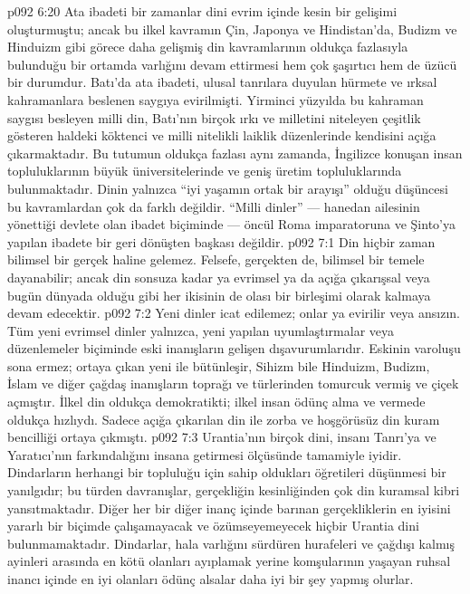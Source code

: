 \vs p092 6:20 Ata ibadeti bir zamanlar dini evrim içinde kesin bir gelişimi oluşturmuştu; ancak bu ilkel kavramın Çin, Japonya ve Hindistan’da, Budizm ve Hinduizm gibi görece daha gelişmiş din kavramlarının oldukça fazlasıyla bulunduğu bir ortamda varlığını devam ettirmesi hem çok şaşırtıcı hem de üzücü bir durumdur. Batı’da ata ibadeti, ulusal tanrılara duyulan hürmete ve ırksal kahramanlara beslenen saygıya evirilmişti. Yirminci yüzyılda bu kahraman saygısı besleyen milli din, Batı’nın birçok ırkı ve milletini niteleyen çeşitlik gösteren haldeki köktenci ve milli nitelikli laiklik düzenlerinde kendisini açığa çıkarmaktadır. Bu tutumun oldukça fazlası aynı zamanda, İngilizce konuşan insan topluluklarının büyük üniversitelerinde ve geniş üretim topluluklarında bulunmaktadır. Dinin yalnızca “iyi yaşamın ortak bir arayışı” olduğu düşüncesi bu kavramlardan çok da farklı değildir. “Milli dinler” --- hanedan ailesinin yönettiği devlete olan ibadet biçiminde --- öncül Roma imparatoruna ve Şinto’ya yapılan ibadete bir geri dönüşten başkası değildir.
\vs p092 7:1 Din hiçbir zaman bilimsel bir gerçek haline gelemez. Felsefe, gerçekten de, bilimsel bir temele dayanabilir; ancak din sonsuza kadar ya evrimsel ya da açığa çıkarışsal veya bugün dünyada olduğu gibi her ikisinin de olası bir birleşimi olarak kalmaya devam edecektir.
\vs p092 7:2 Yeni dinler icat edilemez; onlar ya evirilir veya ansızın. Tüm yeni evrimsel dinler yalnızca, yeni yapılan uyumlaştırmalar veya düzenlemeler biçiminde eski inanışların gelişen dışavurumlarıdır. Eskinin varoluşu sona ermez; ortaya çıkan yeni ile bütünleşir, Sihizm bile Hinduizm, Budizm, İslam ve diğer çağdaş inanışların toprağı ve türlerinden tomurcuk vermiş ve çiçek açmıştır. İlkel din oldukça demokratikti; ilkel insan ödünç alma ve vermede oldukça hızlıydı. Sadece açığa çıkarılan din ile zorba ve hoşgörüsüz din kuram bencilliği ortaya çıkmıştı.
\vs p092 7:3 Urantia’nın birçok dini, insanı Tanrı’ya ve Yaratıcı’nın farkındalığını insana getirmesi ölçüsünde tamamiyle iyidir. Dindarların herhangi bir topluluğu için sahip oldukları öğretileri  düşünmesi bir yanılgıdır; bu türden davranışlar, gerçekliğin kesinliğinden çok din kuramsal kibri yansıtmaktadır. Diğer her bir diğer inanç içinde barınan gerçekliklerin en iyisini yararlı bir biçimde çalışamayacak ve özümseyemeyecek hiçbir Urantia dini bulunmamaktadır. Dindarlar, hala varlığını sürdüren hurafeleri ve çağdışı kalmış ayinleri arasında en kötü olanları ayıplamak yerine komşularının yaşayan ruhsal inancı içinde en iyi olanları ödünç alsalar daha iyi bir şey yapmış olurlar.
